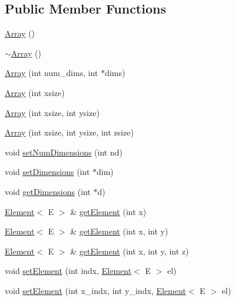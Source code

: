 \subsection*{Public Member Functions}
\begin{DoxyCompactItemize}
\item 
\mbox{\hyperlink{classbridges_1_1_array_a958421b86ff55303b5fc7d505109f9fe}{Array}} ()
\item 
\mbox{\hyperlink{classbridges_1_1_array_abfca49c36c2b6c63c88010df50f5f49c}{$\sim$\+Array}} ()
\item 
\mbox{\hyperlink{classbridges_1_1_array_a25ff771f9ba7f365465f309ed2dd3688}{Array}} (int num\+\_\+dims, int $\ast$dims)
\item 
\mbox{\hyperlink{classbridges_1_1_array_a0a475058b73b938f0fd3f577365aca89}{Array}} (int xsize)
\item 
\mbox{\hyperlink{classbridges_1_1_array_a13b26fc4d2ccb19b277b2acc615efce2}{Array}} (int xsize, int ysize)
\item 
\mbox{\hyperlink{classbridges_1_1_array_a3504e71cacffd343edf8b9ea16f75eb4}{Array}} (int xsize, int ysize, int zsize)
\item 
void \mbox{\hyperlink{classbridges_1_1_array_a6b91612bb7b89a563571fd1ea417ef2a}{set\+Num\+Dimensions}} (int nd)
\item 
void \mbox{\hyperlink{classbridges_1_1_array_a4e179915ab7820bbafe9b3433656b182}{set\+Dimensions}} (int $\ast$dim)
\item 
void \mbox{\hyperlink{classbridges_1_1_array_ae195a6f06157e82c68483ff636e30f5e}{get\+Dimensions}} (int $\ast$d)
\item 
\mbox{\hyperlink{classbridges_1_1_element}{Element}}$<$ E $>$ \& \mbox{\hyperlink{classbridges_1_1_array_a8b4c6cc491829d814e0b6b0ce3654417}{get\+Element}} (int x)
\item 
\mbox{\hyperlink{classbridges_1_1_element}{Element}}$<$ E $>$ \& \mbox{\hyperlink{classbridges_1_1_array_acd5e730e0369b1fa699a5907e889f213}{get\+Element}} (int x, int y)
\item 
\mbox{\hyperlink{classbridges_1_1_element}{Element}}$<$ E $>$ \& \mbox{\hyperlink{classbridges_1_1_array_a7006eeac547c391cb7e8eb19c56ae9f6}{get\+Element}} (int x, int y, int z)
\item 
void \mbox{\hyperlink{classbridges_1_1_array_aae8ec0bd850e00593487022bc914afe0}{set\+Element}} (int indx, \mbox{\hyperlink{classbridges_1_1_element}{Element}}$<$ E $>$ el)
\item 
void \mbox{\hyperlink{classbridges_1_1_array_a428cc76d22af71c5ae57dc293780b8ec}{set\+Element}} (int x\+\_\+indx, int y\+\_\+indx, \mbox{\hyperlink{classbridges_1_1_element}{Element}}$<$ E $>$ el)

\end{DoxyCompactItemize}
